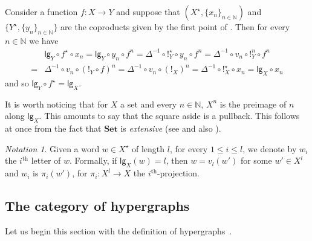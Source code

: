 \documentclass[3p]{elsarticle}
\newcommand{\lgh}{\mathsf{lg}}
\newcommand{\Set}{\mathbf{Set}}
\theoremstyle{remark}
\newtheorem*{notaz}{Notation}
\theoremstyle{definition}
\begin{document}
\begin{rem}\label{rem:le} Consider a function $f\colon X\to Y$  and suppose that $(X^\star, \{x_n\}_{n\in \mathbb{N}})$ and $\{Y^\star, \{y_n\}_{n\in \mathbb{N}}\}$ are the coproducts given by the first point of .
Then for every $n\in \mathbb{N}$ we have 
	\begin{align*}
&\lgh_{Y}\circ f^\star \circ x_n = \lgh_{Y}\circ y_n \circ f^n= \Delta^{-1}\circ !^\star_{Y} \circ y_n\circ f^n =  \Delta^{-1}\circ v_n \circ !^n_{Y} \circ f^n \\=& \Delta^{-1}\circ v_n \circ (!_{Y} \circ f)^n  = \Delta^{-1}\circ v_n \circ (!_{X})^n = \Delta^{-1}\circ !^\star_{X} \circ x_n = \lgh_{X}\circ x_n
	\end{align*}
and so $\lgh_{Y}\circ f^\star= \lgh_{X}$.
\end{rem}

\noindent
\begin{minipage}[r]{.83\linewidth}
	\begin{rem}\label{rem:len} It is worth noticing that for $X$ a set and every $n\in \mathbb{N}$, $X^n$ is the preimage of $n$ along $\lgh_{X}$. This amounts to say that the square aside is a pullback. This follows at once from the fact that $\Set$ is \emph{extensive} (see \cite{carboni1993introduction} and also ). 
	\end{rem}
\end{minipage}\hfill \begin{minipage}[l]{.15\linewidth} \vspace{-.2cm}
\xymatrix@R=13pt{X^n \ar@{>->}[r]^{v_n} \ar[d]^{!_{X^n}}& X^\star  \ar[d]^{\lgh_{X}}\\ 1 \ar@{>->}[r]^{\delta_n} & \mathbb{N}}
\end{minipage}

\begin{notaz}
	Given a word $w\in X^\star$ of length $l$, for every $1\leq i \leq l$, we denote by $w_i$ the $i^\mathrm{th}$ letter of $w$.  Formally, if $\lgh_X(w)=l$, then $w=v_l(w')$ for some $w'\in X^l$ and $w_i$ is $\pi_i(w')$, for $\pi_i\colon X^l\to X$ the $i^\mathrm{th}$-projection.
\end{notaz}

\subsection{The category of hypergraphs}\label{sub:hyp}

Let us begin this section with the definition of hypergraphs~\cite[Sec.~3]{bonchi2022string}.
\end{document}

